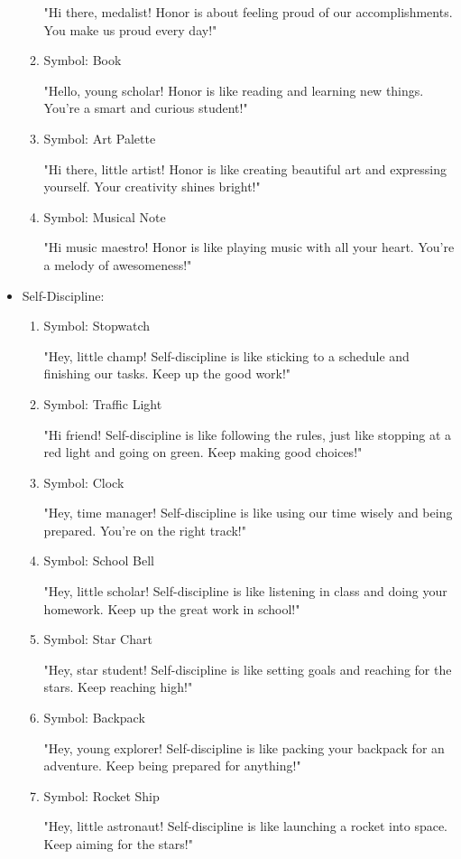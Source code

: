 \documentclass[14pt, letterpaper, twoside]{article}
\begin{document}
\begin{itemize}
\begin{enumerate}
		"Hi there, medalist! Honor is about feeling proud of our accomplishments. You make
		us proud every day!"
		\item Symbol: Book 
		
		"Hello, young scholar! Honor is like reading and learning new things. You're a
		smart and curious student!"
		\item Symbol: Art Palette 
		
		"Hi there, little artist! Honor is like creating beautiful art and expressing
		yourself. Your creativity shines bright!"
		\item Symbol: Musical Note 
		
		"Hi music maestro! Honor is like playing music with all your heart. You're a
		melody of awesomeness!"
		\end{enumerate}
	\item Self-Discipline:
		\begin{enumerate}
		\item Symbol: Stopwatch 
		
		"Hey, little champ! Self-discipline is like sticking to a schedule and finishing
		our tasks. Keep up the good work!"
		\item Symbol: Traffic Light 
		
		"Hi friend! Self-discipline is like following the rules, just like stopping at a
		red light and going on green. Keep making good choices!"
		\item Symbol: Clock 
		
		"Hey, time manager! Self-discipline is like using our time wisely and being
		prepared. You're on the right track!"
		\item  Symbol: School Bell 
		
		"Hey, little scholar! Self-discipline is like listening in class and doing your
		homework. Keep up the great work in school!"
		\item Symbol: Star Chart 
		
		"Hey, star student! Self-discipline is like setting goals and reaching for the
		stars. Keep reaching high!"
		\item Symbol: Backpack 
		
		"Hey, young explorer! Self-discipline is like packing your backpack for an
		adventure. Keep being prepared for anything!"
		\item Symbol: Rocket Ship 
		
		"Hey, little astronaut! Self-discipline is like launching a rocket into space.
		Keep aiming for the stars!"
		\end{enumerate}
	\end{itemize}
\end{document}
